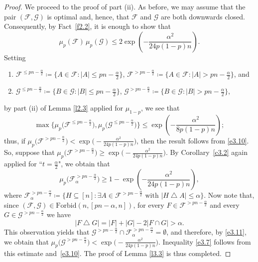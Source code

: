 \documentclass[10pt]{amsart}
\theoremstyle{remark}
\newcommand{\meg}{\geqslant}
\newcommand{\mik}{\leqslant}
\newcommand{\Fcal}{\mathcal{F}}
\newcommand{\Gcal}{\mathcal{G}}
\newcommand{\Forb}[2]{\mathrm{Forbid}\left(#1,#2\right)}
\begin{document}
\begin{proof}
We proceed to the proof of part (ii). As before, we may assume that the pair $(\Fcal,\Gcal)$ is optimal
and, hence, that $\Fcal$ and $\Gcal$ are both downwards closed. Consequently, by Fact~\ref{f2.2},
it is enough to show that
\begin{equation} \label{e3.9}
\mu_{p}(\Fcal)\, \mu_{p}(\Gcal)\mik 2 \exp\left(-\frac{\alpha^2}{24p(1-p)n}\right).
\end{equation}
Setting
\begin{enumerate}
\item[$\bullet$] $\Fcal^{\mik pn-\frac{\alpha}{2}}\coloneqq \{A\in \Fcal: |A|\mik pn-\frac{\alpha}{2}\}$,
$\Fcal^{>pn-\frac{\alpha}{2}}\coloneqq \{A\in \Fcal : |A|>pn-\frac{\alpha}{2}\}$, and
\item[$\bullet$] $\Gcal^{\mik pn-\frac{\alpha}{2}}\coloneqq \{B\in \Gcal : |B|\mik pn-\frac{\alpha}{2}\}$,
$\Gcal^{>pn-\frac{\alpha}{2}}\coloneqq \{B\in \Gcal : |B|>pn-\frac{\alpha}{2}\}$,
\end{enumerate}
by part (ii) of Lemma \ref{l2.3} applied for $\mu_{1-p}$, we see that
\begin{equation} \label{e3.10}
\max\big\{ \mu_{p}\big(\Fcal^{\mik pn-\frac{\alpha}{2}}\big),
\mu_{p}\big(\Gcal^{\mik pn-\frac{\alpha}{2}}\big)\big\} \mik
\exp\left(-\frac{\alpha^2}{8p(1-p)n}\right);
\end{equation}
thus, if $\mu_{p}\big(\Fcal^{> pn-\frac{\alpha}{2}}\big)<\exp\big(-\frac{\alpha^2}{24p(1-p)n}\big)$,
then the result follows from \eqref{e3.10}. So, suppose that
$\mu_{p}\big(\Fcal^{>pn-\frac{\alpha}{2}}\big)\meg \exp\big(-\frac{\alpha^2}{24p(1-p)n}\big)$.
By Corollary~\ref{c3.2} again applied for ``$t=\frac{\alpha}{2}$", we obtain that
\begin{equation} \label{e3.11}
\mu_{p}\big(\Fcal^{>pn-\frac{\alpha}{2}}_\alpha\big)\meg
1-\exp\left(-\frac{\alpha^2}{24p(1-p)n}\right),
\end{equation}
where $\Fcal^{>pn-\frac{\alpha}{2}}_\alpha\coloneqq \{H\subseteq [n]:
\exists A\in \Fcal^{>pn-\frac{\alpha}{2}} \text{ with } |H\bigtriangleup A|\mik \alpha\}$.
Now note that, since $(\Fcal,\Gcal)\in\Forb{n}{[pn-\alpha,n]}$, for every
$F\in \Fcal^{> pn-\frac{\alpha}{2}}$ and every $G\in \Gcal^{> pn-\frac{\alpha}{2}}$ we have
\begin{equation} \label{e3.12}
|F\bigtriangleup G|=|F|+|G|-2|F\cap G|>\alpha.
\end{equation}
This observation yields that $\Gcal^{> pn-\frac{\alpha}{2}}\cap \Fcal^{> pn-\frac{\alpha}{2}}_\alpha=\emptyset$,
and therefore, by \eqref{e3.11}, we obtain that
$\mu_{p}\big(\Gcal^{> pn-\frac{\alpha}{2}}\big)<\exp\big(-\frac{\alpha^2}{24p(1-p)n}\big)$.
Inequality \eqref{e3.7} follows from this estimate and~\eqref{e3.10}.
The proof of Lemma \ref{l3.3} is thus completed.
\end{proof}
\end{document}
